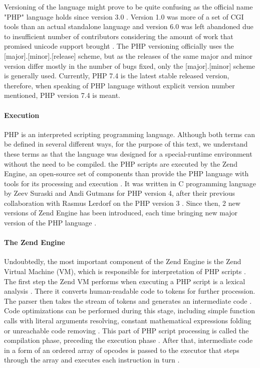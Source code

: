 Versioning of the language might prove to be quite confusing as the official name "PHP" language holds since version 3.0 \citep{php.manual}. Version 1.0 was more of a set of CGI tools than an actual standalone language and version 6.0 was left abandoned due to insufficient number of contributors considering the amount of work that promised unicode support brought \citep{php.manual, php.version6}. The PHP versioning officially uses the [major].[minor].[release] scheme, but as the releases of the same major and minor version differ mostly in the number of bugs fixed, only the [major].[minor] scheme is generally used. Currently, PHP 7.4 is the latest stable released version, therefore, when speaking of PHP language without explicit version number mentioned, PHP version 7.4 is meant.

\paragraph{Execution}
PHP is an interpreted scripting programming language. Although both terms can be defined in several different ways, for the purpose of this text, we understand these terms as that the language was designed for a special-runtime environment without the need to be compiled. the PHP scripts are executed by the Zend Engine, an open-source set of components than provide the PHP language with tools for its processing and execution \citep{php.internals, modern.php}. It was written in C programming language by Zeev Suraski and Andi Gutmans for PHP version 4, after their previous collaboration with Rasmus Lerdorf on the PHP version 3 \citep{php.manual}. Since then, 2 new versions of Zend Engine has been introduced, each time bringing new major version of the PHP language \citep{php.manual, php.wiki}.

\paragraph{The Zend Engine}
Undoubtedly, the most important component of the Zend Engine is the Zend Virtual Machine (VM), which is responsible for interpretation of PHP scripts \citep{php.internals}. The first step the Zend VM performs when executing a PHP script is a lexical analysis \citep{advanced.php}. There it converts human-readable code to tokens for further procession. The parser then takes the stream of tokens and generates an intermediate code \citep{advanced.php}. Code optimizations can be performed during this stage, including simple function calls with literal arguments resolving, constant mathematical expressions folding or unreachable code removing \citep{advanced.php}. This part of PHP script processing is called the compilation phase, preceding the execution phase \citep{advanced.php}. After that, intermediate code in a form of an ordered array of opcodes is passed to the executor that steps through the array and executes each instruction in turn \citep{advanced.php}. 

